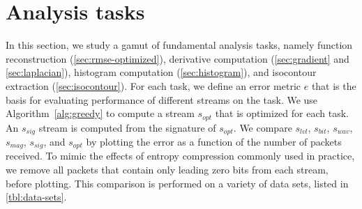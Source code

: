 \section{Analysis tasks}\label{sec:analysis-tasks}


In this section, we study a gamut of fundamental analysis tasks, namely function reconstruction
(\autoref{sec:rmse-optimized}), derivative computation (\autoref{sec:gradient} and
\autoref{sec:laplacian}), histogram computation (\autoref{sec:histogram}), and isocontour extraction
(\autoref{sec:isocontour}). For each task, we define an error metric $e$ that is the basis for
evaluating performance of different streams on the task. We use Algorithm~\ref{alg:greedy} to
compute a stream $s_{opt}$ that is optimized for each task. An $s_{sig}$ stream is computed from the
signature of $s_{opt}$. We compare $s_{lvl}$, $s_{bit}$, $s_{wav}$, $s_{mag}$, $s_{sig}$, and
$s_{opt}$ by plotting the error as a function of the number of packets received. To mimic the
effects of entropy compression commonly used in practice, we remove all packets that contain only
leading zero bits from each stream, before plotting. This comparison is performed on a variety of
data sets, listed in \autoref{tbl:data-sets}. 

